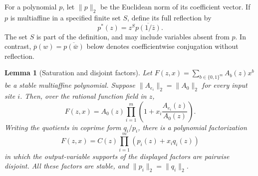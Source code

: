 \documentclass[reqno]{amsart}
\newtheorem{lemma}[theorem]{Lemma}
\theoremstyle{definition}
\theoremstyle{remark}
\begin{document}
For a polynomial \(p\), let \(\|p\|_2\) be the Euclidean norm of
its coefficient vector.  If \(p\) is multiaffine in a specified
finite set \(S\), define its full reflection by
\begin{equation}
 p^*(z)=z^S\overline{p(1/\bar z)}.
 \label{stat:reflection}
\end{equation}
The set \(S\) is part of the definition, and may include variables
absent from \(p\).  In contrast, \(\overline p(w)=
\overline{p(\bar w)}\) below denotes coefficientwise conjugation
without reflection.

\begin{lemma}[Saturation and disjoint factors]
\label{stat:saturation}
Let \(F(z,x)=\sum_{b\in\{0,1\}^m}A_b(z)x^b\) be a stable
multiaffine polynomial.  Suppose
\(\|A_{e_i}\|_2=\|A_0\|_2\) for every input site \(i\).
Then, over the rational function field in \(z\),
\begin{equation}
 F(z,x)=A_0(z)\prod_{i=1}^m
       \left(1+x_i\frac{A_{e_i}(z)}{A_0(z)}\right).
 \label{stat:saturation-product}
\end{equation}
Writing the quotients in coprime form \(q_i/p_i\), there is a
polynomial factorization
\begin{equation}
 F(z,x)=C(z)\prod_{i=1}^m(p_i(z)+x_iq_i(z))
 \label{stat:primitive-product}
\end{equation}
in which the output-variable supports of the displayed factors are
pairwise disjoint.  All these factors are stable, and
\(\|p_i\|_2=\|q_i\|_2\).
\end{lemma}
\end{document}
